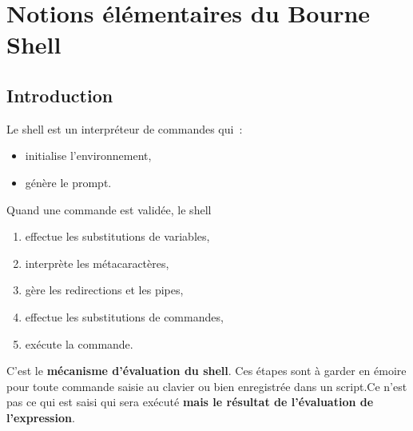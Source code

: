 %
%

\setcounter{remarque-cnt}{1}
\setcounter{example-cnt}{1}
\chapter{Notions {\'e}l{\'e}mentaires du Bourne Shell}
\thispagestyle{fancy}

\section{Introduction}

Le shell est un interpr{\'e}teur de commandes qui~:
\begin{itemize}
	\item initialise l'environnement,
	\item g{\'e}n{\`e}re le prompt.
\end{itemize}

Quand une commande est valid{\'e}e, le shell
\begin{enumerate}
	\item  effectue les substitutions de variables,
	\item interpr{\`e}te les m{\'e}tacaract{\`e}res,
	\item g{\`e}re les redirections et les pipes,
	\item effectue les substitutions de commandes,
	\item ex{\'e}cute la commande.
\end{enumerate}
C'est le \textbf{m{\'e}canisme d'{\'e}valuation du shell}. Ces
{\'e}tapes sont {\`a} garder en {\'e}moire pour toute commande saisie au
clavier ou bien enregistr{\'e}e dans un script.{\Large Ce n'est pas ce
qui est saisi qui sera ex{\'e}cut{\'e} \textbf{mais le r{\'e}sultat de
l'{\'e}valuation de l'expression}.}

